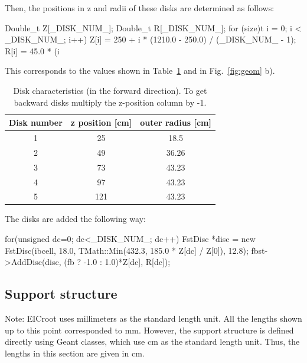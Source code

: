 \documentclass[12pt]{article}
\begin{document}
Then, the positions in z and radii of these disks are determined as follows:

\begin{tcolorbox}
\begin{verbnobox}[\scriptsize]
Double_t Z[_DISK_NUM_];
Double_t R[_DISK_NUM_];
for (size)t i = 0; i  < _DISK_NUM_; i++) {
      Z[i] = 250 + i * (1210.0 - 250.0) / (_DISK_NUM_ - 1);
      R[i] = 45.0 * (i %
}
\end{verbnobox}  
\end{tcolorbox}

This corresponds to the values shown in Table~\ref{tab:disks}
and in Fig.~\ref{fig:geom} b).

\begin{table}[H]
\centering
\caption{Disk characteristics (in the forward direction). To get backward disks multiply the z-position column by -1.}
\label{tab:disks}
\begin{tabular}{c|cc}
\hline
Disk number & z position {[}cm{]} & outer radius {[}cm{]} \\
\hline \hline
1           & 25                  & 18.5                  \\
2           & 49                  & 36.26                 \\
3           & 73                  & 43.23                 \\
4           & 97                  & 43.23                 \\
5           & 121                 & 43.23                
\end{tabular}
\end{table}

The disks are added the following way:

\begin{tcolorbox}
\begin{verbnobox}[\scriptsize]
for(unsigned dc=0; dc<_DISK_NUM_; dc++) {
    FstDisc *disc = new FstDisc(ibcell, 18.0, TMath::Min(432.3, 185.0 * Z[dc] / Z[0]), 12.8);
    fbst->AddDisc(disc, (fb ? -1.0 : 1.0)*Z[dc], R[dc]);
}
\end{verbnobox}  
\end{tcolorbox}    

\subsection{Support structure}

\color{red}
Note: EICroot uses millimeters as the standard length unit. All the lengths shown up to this point corresponded to mm.
However, the support structure is defined directly using Geant classes, which use cm as the standard length unit.
Thus, the lengths in this section are given in cm.
\color{black}
\end{document}
